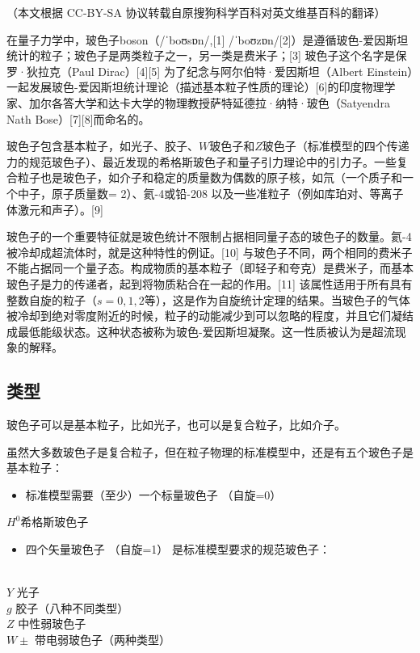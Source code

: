 
（本文根据 CC-BY-SA 协议转载自原搜狗科学百科对英文维基百科的翻译）

在量子力学中，玻色子boson（/ˈboʊsɒn/,[1] /ˈboʊzɒn/[2]）是遵循玻色-爱因斯坦统计的粒子；玻色子是两类粒子之一，另一类是费米子；[3] 玻色子这个名字是保罗·狄拉克（Paul Dirac）[4][5] 为了纪念与阿尔伯特·爱因斯坦（Albert Einstein）一起发展玻色-爱因斯坦统计理论（描述基本粒子性质的理论）[6]的印度物理学家、加尔各答大学和达卡大学的物理教授萨特延德拉·纳特·玻色（Satyendra Nath Bose）[7][8]而命名的。

玻色子包含基本粒子，如光子、胶子、$W$玻色子和$Z$玻色子（标准模型的四个传递力的规范玻色子）、最近发现的希格斯玻色子和量子引力理论中的引力子。一些复合粒子也是玻色子，如介子和稳定的质量数为偶数的原子核，如氘（一个质子和一个中子，原子质量数= 2）、氦-4或铅-208 以及一些准粒子（例如库珀对、等离子体激元和声子）。[9]

玻色子的一个重要特征就是玻色统计不限制占据相同量子态的玻色子的数量。氦-4被冷却成超流体时，就是这种特性的例证。[10] 与玻色子不同，两个相同的费米子不能占据同一个量子态。构成物质的基本粒子（即轻子和夸克）是费米子，而基本玻色子是力的传递者，起到将物质粘合在一起的作用。[11] 该属性适用于所有具有整数自旋的粒子（$s=0,1,2$等），这是作为自旋统计定理的结果。当玻色子的气体被冷却到绝对零度附近的时候，粒子的动能减少到可以忽略的程度，并且它们凝结成最低能级状态。这种状态被称为玻色-爱因斯坦凝聚。这一性质被认为是超流现象的解释。

\subsection{类型}
玻色子可以是基本粒子，比如光子，也可以是复合粒子，比如介子。

虽然大多数玻色子是复合粒子，但在粒子物理的标准模型中，还是有五个玻色子是基本粒子：
\begin{itemize}
\item 标准模型需要（至少）一个标量玻色子 （自旋=0）
\end{itemize}
$H^0$希格斯玻色子
\begin{itemize}
\item 四个矢量玻色子 （自旋=1） 是标准模型要求的规范玻色子：
\end{itemize}\\
$Y$   光子\\
$g$   胶子（八种不同类型）\\
$Z$   中性弱玻色子\\
$W\pm$   带电弱玻色子（两种类型）\\

